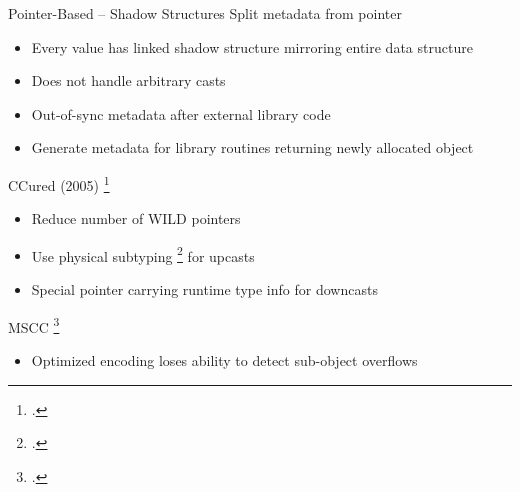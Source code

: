 \documentclass[aspectratio=169]{beamer}
\begin{document}
\begin{frame}{Pointer-Based -- Shadow Structures}
Split metadata from pointer
\begin{itemize}
    \item Every value has linked shadow structure mirroring entire data structure
    \item Does not handle arbitrary casts %
    \item Out-of-sync metadata after external library code
    \item Generate metadata for library routines returning newly allocated object
\end{itemize}
\vspace{-0.1in}
CCured (2005) \footcite{necula_ccured:_2005} 
  \begin{itemize}
     \item Reduce number of WILD pointers
     \item Use physical subtyping \footcite{siff_coping_1999} for upcasts
     \item Special pointer carrying runtime type info for downcasts
  \end{itemize}
\vspace{-0.1in}
MSCC \footcite{xu_efficient_2004}
  \begin{itemize}
     \item Optimized encoding loses ability to detect sub-object overflows
  \end{itemize}
\end{frame}
\end{document}
